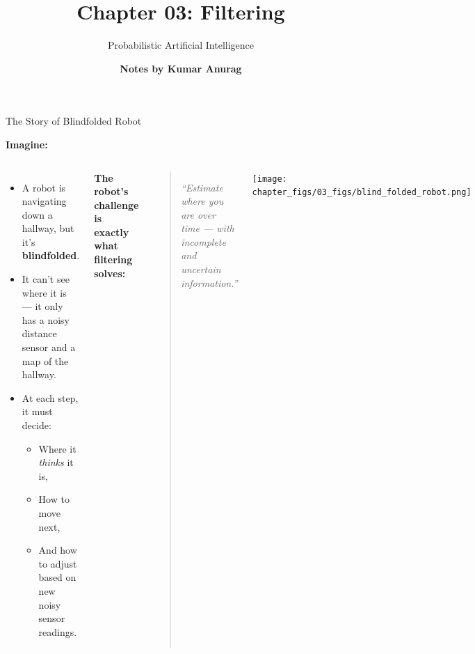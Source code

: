 \documentclass[handout,aspectratio=169]{beamer}
\title{
Chapter 03: Filtering
}
\author{\bf Notes by Kumar Anurag}
\date{}
\subtitle{
Probabilistic Artificial Intelligence
}
\begin{document}
{
	\begin{frame}
		\maketitle
	\end{frame}}



\begin{frame}{The Story of Blindfolded Robot}

\textbf{Imagine:}

\begin{columns}
\begin{itemize}
  \item A robot is navigating down a hallway, but it’s \textbf{blindfolded}.
  \item It can’t see where it is — it only has a noisy distance sensor and a map of the hallway.
  \item At each step, it must decide:
  \begin{itemize}
    \item Where it \textit{thinks} it is,
    \item How to move next,
    \item And how to adjust based on new noisy sensor readings.
  \end{itemize}
\end{itemize}

\vspace{1em}
\textbf{The robot’s challenge is exactly what filtering solves:}
\begin{quote}
  \centering
  \emph{“Estimate where you are over time — with incomplete and uncertain information.”}
\end{quote}

    \begin{center}
		\texttt{[image: chapter\_figs/03\_figs/blind\_folded\_robot.png]}
\end{center}
\end{columns}


\end{frame}
\end{document}
